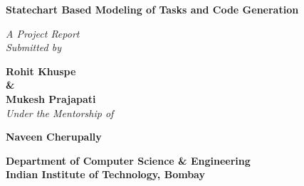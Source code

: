 \documentclass{article}
\begin{document}
\begin{titlepage}

\vspace{0.2in}

\begin{center}
\Large{\bf Statechart Based Modeling of Tasks and Code Generation}
\end{center}


\begin{center}

\vspace{15 mm}
{\it A Project Report \\
Submitted by}\\
\vspace{10mm}

\large{\bf Rohit Khuspe \\ \& \\ Mukesh Prajapati}
\\
\vspace{10mm}
 {\it Under the Mentorship of}
 \vspace{5mm}

 \large{\bf Naveen Cherupally} \\
\vspace{12 mm}
\vspace{10 mm}

\large{\bf Department of Computer Science \& Engineering} \\
\vspace{7mm}
\large{\bf Indian Institute of Technology, Bombay}
\end{center}

\end{titlepage}
\newpage
{}
\tableofcontents
\newpage
\newpage
\listoffigures
\newpage
{}
\begin{abstract}
 Statecharts are one of the 5 UML diagrams which can be used to model the
dynamic behavior of the system.Statecharts are used to give abstract description of the behaviour of a system. This behaviour is analysed and represented as a series of events that can occurs in one or more possible state.
 It is highly desirable to represent any complex system with the
statecharts as they provide much abstraction
 which is very useful to implement a system. Writing the code manually for
building of any system includes lot
 of man power(resources) and prone to errors and most importantly consumes
much time. To make the task simple it is very
 desirable to auto-generate the code from the statecharts.  In this project we will be learning syntax and symantics of statecharts, how we can model a particular system or task using statecharts with the help of various tools.
 \end{abstract}
\newpage
\end{document}
